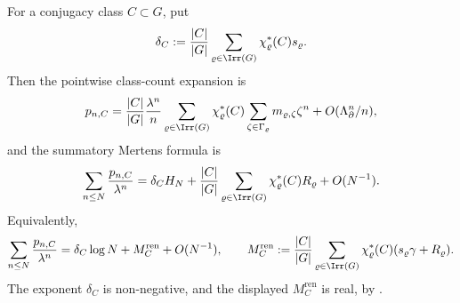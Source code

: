 \begin{proposition}
  For a conjugacy class \(C\subset G\), put
  \begin{equation}\label{eq:renormalized-class-density}
    \delta_C:=
    \frac{|C|}{|G|}
      \sum_{\varrho\in\Irr(G)}
        \chi_\varrho^\ast(C)s_\varrho .
  \end{equation}
  Then the pointwise class-count expansion is
  \begin{equation}\label{eq:renormalized-class-pointwise-expansion}
    p_{n,C}
    =
    \frac{|C|}{|G|}
    \frac{\lambda^n}{n}
      \sum_{\varrho\in\Irr(G)}
        \chi_\varrho^\ast(C)
        \sum_{\zeta\in\Gamma_\varrho}
          m_{\varrho,\zeta}\zeta^n
    +O(\Lambda_\partial^n/n),
  \end{equation}
  and the summatory Mertens formula is
  \begin{equation}\label{eq:renormalized-class-mertens-harmonic}
    \sum_{n\le N}\frac{p_{n,C}}{\lambda^n}
    =
    \delta_C H_N+
    \frac{|C|}{|G|}
      \sum_{\varrho\in\Irr(G)}
        \chi_\varrho^\ast(C)R_\varrho
    +O(N^{-1}).
  \end{equation}
  Equivalently,
  \begin{equation}\label{eq:renormalized-class-mertens-log}
    \sum_{n\le N}\frac{p_{n,C}}{\lambda^n}
    =
    \delta_C\log N+M_C^{\mathrm{ren}}+O(N^{-1}),
    \qquad
    M_C^{\mathrm{ren}}:=
    \frac{|C|}{|G|}
      \sum_{\varrho\in\Irr(G)}
        \chi_\varrho^\ast(C)(s_\varrho\gamma+R_\varrho).
  \end{equation}
  The exponent \(\delta_C\) is non-negative, and the displayed
  \(M_C^{\mathrm{ren}}\) is real, by
  .
\end{proposition}

